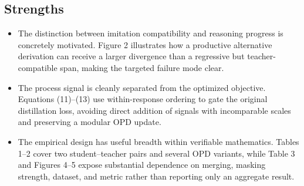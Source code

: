 \subsection*{Strengths}
\begin{itemize}
\item The distinction between imitation compatibility and reasoning progress is concretely motivated. Figure 2 illustrates how a productive alternative derivation can receive a larger divergence than a regressive but teacher-compatible span, making the targeted failure mode clear.
\item The process signal is cleanly separated from the optimized objective. Equations (11)--(13) use within-response ordering to gate the original distillation loss, avoiding direct addition of signals with incomparable scales and preserving a modular OPD update.
\item The empirical design has useful breadth within verifiable mathematics. Tables 1--2 cover two student--teacher pairs and several OPD variants, while Table 3 and Figures 4--5 expose substantial dependence on merging, masking strength, dataset, and metric rather than reporting only an aggregate result.
\end{itemize}


